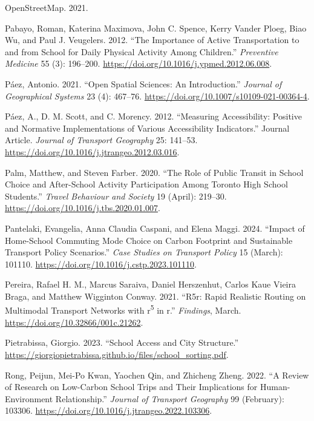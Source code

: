 \documentclass[
default
]{sn-jnl}
\newlength{\cslhangindent}
\newenvironment{CSLReferences}[2] %
 {\begin{list}{}{%
  \setlength{\itemindent}{0pt}
  \setlength{\leftmargin}{0pt}
  \setlength{\parsep}{0pt}
  \ifodd #1
   \setlength{\leftmargin}{\cslhangindent}
   \setlength{\itemindent}{-1\cslhangindent}
  \fi
  \setlength{\itemsep}{#2\baselineskip}}}
 {\end{list}}
\begin{document}
\begin{CSLReferences}{1}{0}
OpenStreetMap. 2021.

Pabayo, Roman, Katerina Maximova, John C. Spence, Kerry Vander Ploeg,
Biao Wu, and Paul J. Veugelers. 2012. {``The Importance of Active
Transportation to and from School for Daily Physical Activity Among
Children.''} \emph{Preventive Medicine} 55 (3): 196--200.
\url{https://doi.org/10.1016/j.ypmed.2012.06.008}.

Páez, Antonio. 2021. {``Open Spatial Sciences: An Introduction.''}
\emph{Journal of Geographical Systems} 23 (4): 467--76.
\url{https://doi.org/10.1007/s10109-021-00364-4}.

Páez, A., D. M. Scott, and C. Morency. 2012. {``Measuring Accessibility:
Positive and Normative Implementations of Various Accessibility
Indicators.''} Journal Article. \emph{Journal of Transport Geography}
25: 141--53. \url{https://doi.org/10.1016/j.jtrangeo.2012.03.016}.

Palm, Matthew, and Steven Farber. 2020. {``The Role of Public Transit in
School Choice and After-School Activity Participation Among Toronto High
School Students.''} \emph{Travel Behaviour and Society} 19 (April):
219--30. \url{https://doi.org/10.1016/j.tbs.2020.01.007}.

Pantelaki, Evangelia, Anna Claudia Caspani, and Elena Maggi. 2024.
{``Impact of Home-School Commuting Mode Choice on Carbon Footprint and
Sustainable Transport Policy Scenarios.''} \emph{Case Studies on
Transport Policy} 15 (March): 101110.
\url{https://doi.org/10.1016/j.cstp.2023.101110}.

Pereira, Rafael H. M., Marcus Saraiva, Daniel Herszenhut, Carlos Kaue
Vieira Braga, and Matthew Wigginton Conway. 2021. {``R5r: Rapid
Realistic Routing on Multimodal Transport Networks with
r\textsuperscript{5} in r.''} \emph{Findings}, March.
\url{https://doi.org/10.32866/001c.21262}.

Pietrabissa, Giorgio. 2023. {``School Access and City Structure.''}
\url{https://giorgiopietrabissa.github.io/files/school_sorting.pdf}.

Rong, Peijun, Mei-Po Kwan, Yaochen Qin, and Zhicheng Zheng. 2022. {``A
Review of Research on Low-Carbon School Trips and Their Implications for
Human-Environment Relationship.''} \emph{Journal of Transport Geography}
99 (February): 103306.
\url{https://doi.org/10.1016/j.jtrangeo.2022.103306}.


\end{CSLReferences}
\end{document}
